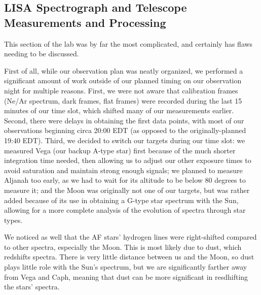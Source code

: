 \documentclass[twocolumn]{aastex702}
\begin{document}
		\subsection{LISA Spectrograph and Telescope Measurements and Processing}\label{ssec:telescope-disc}
  
  		This section of the lab was by far the most complicated, and certainly has flaws needing to be discussed.
  		
  		First of all, while our observation plan was neatly organized, we performed a significant amount of work outside of our planned timing on our observation night for multiple reasons. First, we were not aware that calibration frames (Ne/Ar spectrum, dark frames, flat frames) were recorded during the last 15 minutes of our time slot, which shifted many of our measurements earlier. Second, there were delays in obtaining the first data points, with most of our observations beginning circa 20:00 EDT (as opposed to the originally-planned 19:40 EDT). Third, we decided to switch our targets during our time slot: we measured Vega (our backup A-type star) first because of the much shorter integration time needed, then allowing us to adjust our other exposure times to avoid saturation and maintain strong enough signals; we planned to measure Aljanah too early, as we had to wait for its altitude to be below 80 degrees to measure it; and the Moon was originally not one of our targets, but was rather added because of its use in obtaining a G-type star spectrum with the Sun, allowing for a more complete analysis of the evolution of spectra through star types.
  
  		We noticed as well that the AF stars' hydrogen lines were right-shifted compared to other spectra, especially the Moon. This is most likely due to dust, which redshifts spectra. There is very little distance between us and the Moon, so dust plays little role with the Sun's spectrum, but we are significantly farther away from Vega and Caph, meaning that dust can be more significant in resdhifting the stars' spectra.
  		
\end{document}
